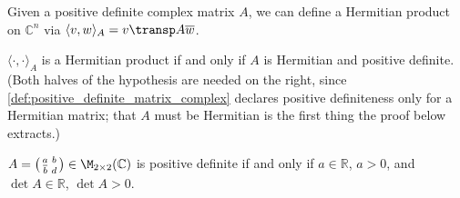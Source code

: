 Given a positive definite complex matrix $A$, we can define a Hermitian product on $\mathbb{C}^n$ via $\langle v, w \rangle_A = v\transp A \overline{w}$.

\begin{claim*}
\label{claim:hermitian_product_iff_pos_def}
    $\langle \cdot, \cdot \rangle_A$ is a Hermitian product if and only if $A$ is Hermitian and positive definite. (Both halves of the hypothesis are needed on the right, since \cref{def:positive_definite_matrix_complex} declares positive definiteness only for a Hermitian matrix; that $A$ must be Hermitian is the first thing the proof below extracts.)
\end{claim*}

\begin{exercise}\label{exc:pos_def_2x2_complex}
    $A = \left(\begin{smallmatrix} a & b \\ \overline{b} & d \end{smallmatrix}\right) \in \M_{2 \times 2}(\mathbb{C})$ is positive definite if and only if $a \in \mathbb{R}$, $a > 0$, and $\det A \in \mathbb{R}$, $\det A > 0$.
\end{exercise}

